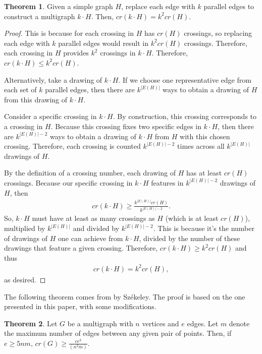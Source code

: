 \documentclass{scrippsthesisclass}
\theoremstyle{definition}
\newtheorem{theorem}{Theorem}[section]
\begin{document}
\begin{theorem} \cite{SzekelyPaper}
    Given a simple graph $H$, replace each edge with $k$ parallel edges to construct a multigraph $k \cdot H$. 
    Then, $cr(k \cdot H) = k^2 cr(H)$. 
\end{theorem}
\begin{proof}
    This is because for each crossing in $H$ has $cr(H)$ crossings, so replacing each edge with $k$ parallel edges would result in $k^2 cr(H)$ crossings.   
    Therefore, each crossing in $H$ provides $k^2$ crossings in $k \cdot H$. 
    Therefore, $cr(k \cdot H) \leq k^2 cr(H)$. 

    Alternatively, take a drawing of $k \cdot H$.
    If we choose one representative edge from each set of $k$ parallel edges, then there are $k^{|E(H)|}$ ways to obtain a drawing of $H$ from this drawing of $k \cdot H$.

    Consider a specific crossing in $k \cdot H$.
    By construction, this crossing corresponds to a crossing in $H$.
    Because this crossing fixes two specific edges in $k \cdot H$, then there are $k^{|E(H)| - 2}$ ways to obtain a drawing of $k \cdot H$ from $H$ with this chosen crossing. 
    Therefore, each crossing is counted $k^{|E(H)| - 2}$ times across all $k^{|E(H)|}$ drawings of $H$. 

    By the definition of a crossing number, each drawing of $H$ has at least $cr(H)$ crossings. 
    Because our specific crossing in $k \cdot H$ features in $k^{|E(H)| - 2}$ drawings of $H$, then 
    \begin{align}
    cr(k \cdot H) \geq \frac{k^{|E(H)|} cr(H)}{k^{|E(H)| - 2}}.
    \end{align}
    So, $k \cdot H$ must have at least as many crossings as $H$ (which is at least $cr(H)$), multiplied by $k^{|E(H)|}$ and divided by $k^{|E(H)| - 2}$.
    This is because it's the number of drawings of $H$ one can achieve from $k \cdot H$, divided by the number of these drawings that feature a given crossing. 
    Therefore, $cr(k \cdot H) \geq k^2 cr(H)$ and thus 
    \begin{align}
    cr(k \cdot H) = k^2 cr(H),
    \end{align}
    as desired.
\end{proof}
The following theorem comes from \cite{SzekelyPaper} by Sz\'{e}keley. The proof is based on the one presented in this paper, with some modifications.
\begin{theorem}
    Let $G$ be a multigraph with $n$ vertices and $e$ edges.
    Let $m$ denote the maximum number of edges between any given pair of points. 
    Then, if $e \geq 5nm$, $cr(G) \geq \frac{ce^3}{(n^2m)}$. 
\end{theorem}
\end{document}
